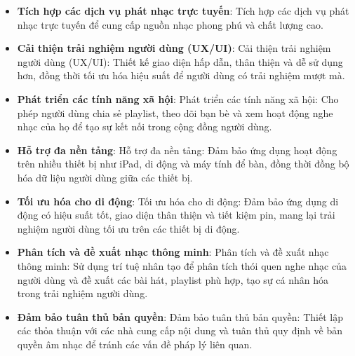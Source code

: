 \begin{itemize}
    \item \textbf{Tích hợp các dịch vụ phát nhạc trực tuyến}: Tích hợp các dịch vụ phát nhạc trực tuyến để cung cấp nguồn nhạc phong phú và chất lượng cao.
    \item \textbf{Cải thiện trải nghiệm người dùng (UX/UI)}: Cải thiện trải nghiệm người dùng (UX/UI): Thiết kế giao diện hấp dẫn, thân thiện và dễ sử dụng hơn, đồng thời tối ưu hóa hiệu suất để người dùng có trải nghiệm mượt mà.
    \item \textbf{Phát triển các tính năng xã hội}: Phát triển các tính năng xã hội: Cho phép người dùng chia sẻ playlist, theo dõi bạn bè và xem hoạt động nghe nhạc của họ để tạo sự kết nối trong cộng đồng người dùng.
    \item \textbf{Hỗ trợ đa nền tảng}: Hỗ trợ đa nền tảng: Đảm bảo ứng dụng hoạt động trên nhiều thiết bị như iPad, di động và máy tính để bàn, đồng thời đồng bộ hóa dữ liệu người dùng giữa các thiết bị.
    \item \textbf{Tối ưu hóa cho di động}: Tối ưu hóa cho di động: Đảm bảo ứng dụng di động có hiệu suất tốt, giao diện thân thiện và tiết kiệm pin, mang lại trải nghiệm người dùng tối ưu trên các thiết bị di động.
    \item \textbf{Phân tích và đề xuất nhạc thông minh}: Phân tích và đề xuất nhạc thông minh: Sử dụng trí tuệ nhân tạo để phân tích thói quen nghe nhạc của người dùng và đề xuất các bài hát, playlist phù hợp, tạo sự cá nhân hóa trong trải nghiệm người dùng.
    \item \textbf{Đảm bảo tuân thủ bản quyền}: Đảm bảo tuân thủ bản quyền: Thiết lập các thỏa thuận với các nhà cung cấp nội dung và tuân thủ quy định về bản quyền âm nhạc để tránh các vấn đề pháp lý liên quan.
\end{itemize}
